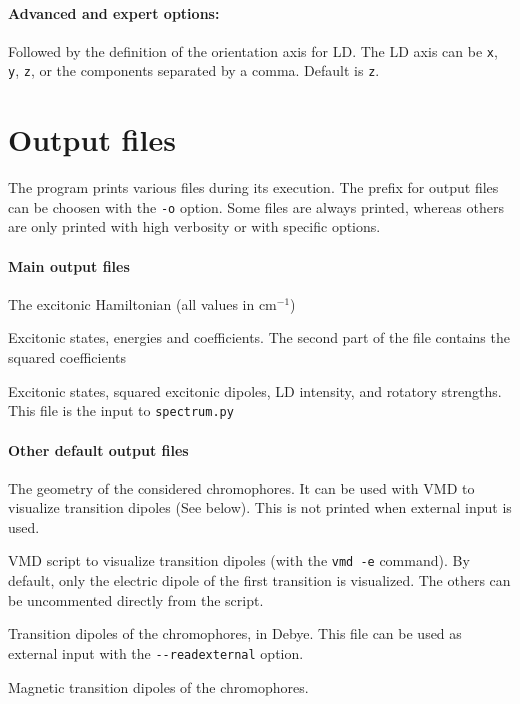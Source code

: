 \documentclass[a4paper,11pt]{article}
\begin{document}
\paragraph*{Advanced and expert options:}
\begin{description}[labelsep=10pt, align=left, labelwidth=80pt,labelindent=0pt,leftmargin=90pt]
\item[\texttt{-{}-ldaxis}] Followed by the definition of the orientation axis for LD. The LD axis can be \texttt{x}, \texttt{y}, \texttt{z}, or the components separated by a comma. Default is \texttt{z}.  
\end{description}

\section{Output files}

The program prints various files during its execution. The prefix for output files can be choosen with the \texttt{-o} option. Some files are always printed, whereas others are only printed with high verbosity or with specific options.

\paragraph*{Main output files}
\begin{description}[labelsep=10pt, align=left, labelwidth=85pt,labelindent=0pt,leftmargin=95pt]
\item[\texttt{matrix.dat}] The excitonic Hamiltonian (all values in cm$^{-1}$)
\item[\texttt{diag.dat}] Excitonic states, energies and coefficients. The second part of the file contains the squared coefficients
\item[\texttt{results.out}] Excitonic states, squared excitonic dipoles, LD intensity, and rotatory strengths. This file is the input to \texttt{spectrum.py}
\end{description}

\paragraph*{Other default output files}
\begin{description}[labelsep=10pt, align=left, labelwidth=85pt,labelindent=0pt,leftmargin=95pt]
\item[\texttt{geometry.xyz}] The geometry of the considered chromophores. It can be used with VMD to visualize transition dipoles (See below). This is not printed when external input is used.
\item[\texttt{visudipo.vmd}] VMD script to visualize transition dipoles (with the \texttt{vmd -e} command). By default, only the electric dipole of the first transition is visualized. The others can be uncommented directly from the script. 
\item[\texttt{dipo.out}] Transition dipoles of the chromophores, in Debye. This file can be used as external input with the \texttt{-{}-readexternal} option.
\item[\texttt{magdipo.out}] Magnetic transition dipoles of the chromophores.
\end{description}
\end{document}
